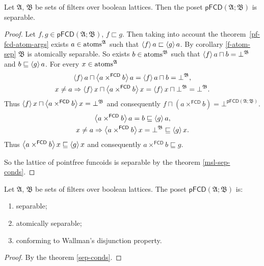 \begin{thm}
\label{pf-fcd-sep}Let $\mathfrak{A}$, $\mathfrak{B}$ be sets of
filters over boolean lattices. Then the poset $\mathsf{pFCD}(\mathfrak{A};\mathfrak{B})$
is separable.\end{thm}
\begin{proof}
Let $f,g\in\mathsf{pFCD}(\mathfrak{A};\mathfrak{B})$, $f\sqsubset g$.
Then taking into account the theorem~\ref{pf-fcd-atom-args} exists
$a\in\operatorname{atoms}^{\mathfrak{A}}$ such that $\left\langle f\right\rangle a\sqsubset\left\langle g\right\rangle a$.
By corollary \ref{f-atom-sep} $\mathfrak{B}$ is atomically separable.
So exists $b\in\operatorname{atoms}^{\mathfrak{B}}$ such that $\left\langle f\right\rangle a\sqcap b=\bot^{\mathfrak{B}}$
and $b\sqsubseteq\left\langle g\right\rangle a$. For every $x\in\operatorname{atoms}^{\mathfrak{A}}$
\begin{gather*}
\left\langle f\right\rangle a\sqcap\left\langle a\times^{\mathsf{FCD}}b\right\rangle a=\left\langle f\right\rangle a\sqcap b=\bot^{\mathfrak{B}},\\
x\ne a\Rightarrow\left\langle f\right\rangle x\sqcap\left\langle a\times^{\mathsf{FCD}}b\right\rangle x=\left\langle f\right\rangle x\sqcap\bot^{\mathfrak{B}}=\bot^{\mathfrak{B}}.
\end{gather*}
Thus $\left\langle f\right\rangle x\sqcap\left\langle a\times^{\mathsf{FCD}}b\right\rangle x=\bot^{\mathfrak{B}}$
and consequently $f\sqcap(a\times^{\mathsf{FCD}}b)=\bot^{\mathsf{pFCD}(\mathfrak{A};\mathfrak{B})}$.
\begin{gather*}
\left\langle a\times^{\mathsf{FCD}}b\right\rangle a=b\sqsubseteq\left\langle g\right\rangle a,\\
x\ne a\Rightarrow\left\langle a\times^{\mathsf{FCD}}b\right\rangle x=\bot^{\mathfrak{B}}\sqsubseteq\left\langle g\right\rangle x.
\end{gather*}
Thus $\left\langle a\times^{\mathsf{FCD}}b\right\rangle x\sqsubseteq\left\langle g\right\rangle x$ and
consequently $a\times^{\mathsf{FCD}}b\sqsubseteq g$.

So the lattice of pointfree funcoids is separable by the theorem \ref{msl-sep-conds}.\end{proof}
\begin{cor}
\label{pf-fcd-is-sep}Let $\mathfrak{A}$, $\mathfrak{B}$ be sets
of filters over boolean lattices. The poset $\mathsf{pFCD}(\mathfrak{A};\mathfrak{B})$
is:
\begin{enumerate}
\item separable;
\item atomically separable;
\item conforming to Wallman's disjunction property.
\end{enumerate}
\end{cor}
\begin{proof}
By the theorem \ref{sep-conds}.\end{proof}
